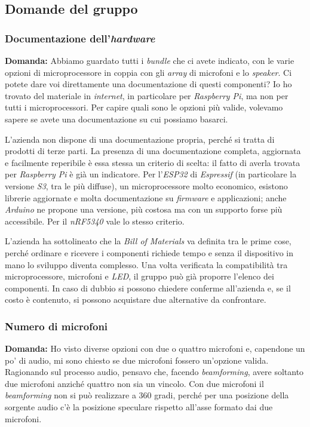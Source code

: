 \documentclass[12pt,a4paper]{article}
\begin{document}
\subsection{Domande del gruppo}

\subsubsection{\texorpdfstring{Documentazione dell'\emph{hardware}}{Documentazione dell'hardware}}

\textbf{Domanda:} Abbiamo guardato tutti i \emph{bundle} che ci avete indicato, con le varie opzioni di microprocessore in coppia con gli \emph{array} di microfoni e lo \emph{speaker}. Ci potete dare voi direttamente una documentazione di questi componenti? Io ho trovato del materiale in \emph{internet}, in particolare per \emph{Raspberry Pi}, ma non per tutti i microprocessori. Per capire quali sono le opzioni più valide, volevamo sapere se avete una documentazione su cui possiamo basarci.

L'azienda non dispone di una documentazione propria, perché si tratta di prodotti di terze parti. La presenza di una documentazione completa, aggiornata e facilmente reperibile è essa stessa un criterio di scelta: il fatto di averla trovata per \emph{Raspberry Pi} è già un indicatore. Per l'\emph{ESP32} di \emph{Espressif} (in particolare la versione \emph{S3}, tra le più diffuse), un microprocessore molto economico, esistono librerie aggiornate e molta documentazione su \emph{firmware} e applicazioni; anche \emph{Arduino} ne propone una versione, più costosa ma con un supporto forse più accessibile. Per il \emph{nRF5340} vale lo stesso criterio.

L'azienda ha sottolineato che la \emph{Bill of Materials} va definita tra le prime cose, perché ordinare e ricevere i componenti richiede tempo e senza il dispositivo in mano lo sviluppo diventa complesso. Una volta verificata la compatibilità tra microprocessore, microfoni e \emph{LED}, il gruppo può già proporre l'elenco dei componenti. In caso di dubbio si possono chiedere conferme all'azienda e, se il costo è contenuto, si possono acquistare due alternative da confrontare.

\subsubsection{Numero di microfoni}

\textbf{Domanda:} Ho visto diverse opzioni con due o quattro microfoni e, capendone un po' di audio, mi sono chiesto se due microfoni fossero un'opzione valida. Ragionando sul processo audio, pensavo che, facendo \emph{beamforming}, avere soltanto due microfoni anziché quattro non sia un vincolo. Con due microfoni il \emph{beamforming} non si può realizzare a 360 gradi, perché per una posizione della sorgente audio c'è la posizione speculare rispetto all'asse formato dai due microfoni.
\end{document}
